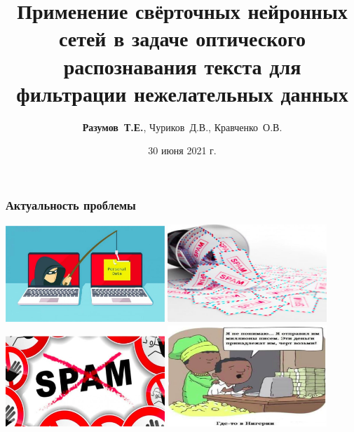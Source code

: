 \documentclass[compress,professionalfont]{beamer}
\title[]{Применение
	свёрточных нейронных сетей в задаче оптического распознавания текста для
	фильтрации нежелательных данных}
\author[Разумов Т.Е.]{
\textbf{Разумов~Т.Е.},
Чуриков~Д.В.,
Кравченко~О.В.  
}
\institute[]{Mail.ru Group\\НТЦ УП РАН\\ФИЦ ИУ РАН}
\date{30 июня 2021 г.}
\begin{document}

\begin{frame}[plain]
	\maketitle
\end{frame}

\begin{frame}
\frametitle{Актуальность проблемы}

\begin{center}
\includegraphics[width=0.45\textwidth]{actual1.jpg}
\includegraphics[width=0.45\textwidth]{actual2.jpg}
\includegraphics[width=0.45\textwidth]{actual3.jpg}
\includegraphics[width=0.45\textwidth]{actual4.jpg}
\end{center}
\end{frame}
\end{document}
